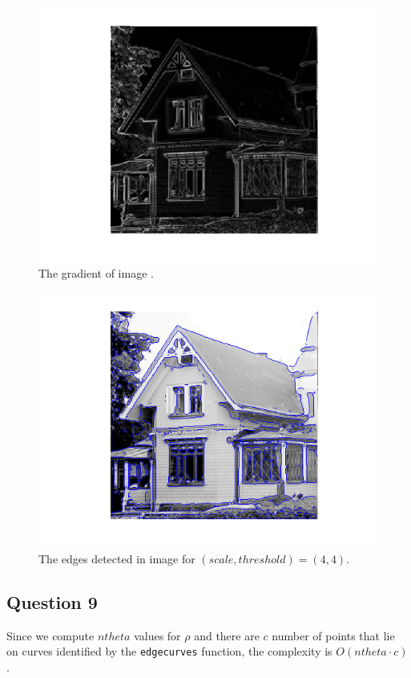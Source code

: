     \begin{figure}[H]
      \centering
      \includegraphics[scale=0.8]{./images/Q8/godthem256/3.png}
      \caption{The gradient of image .}
      \label{fig:Q8_godthem256_3}
    \end{figure}

    \begin{figure}[H]
      \centering
      \includegraphics[scale=0.8]{./images/Q8/godthem256/4.png}
      \caption{The edges detected in image  for
        $(scale, threshold) = (4,4)$.}
      \label{fig:Q8_godthem256_4}
    \end{figure}

  \subsection{Question 9}
    Since we compute $ntheta$ values for $\rho$ and there are $c$ number of
    points that lie on curves identified by the \texttt{edgecurves} function,
    the complexity is $O(ntheta \cdot c)$.

